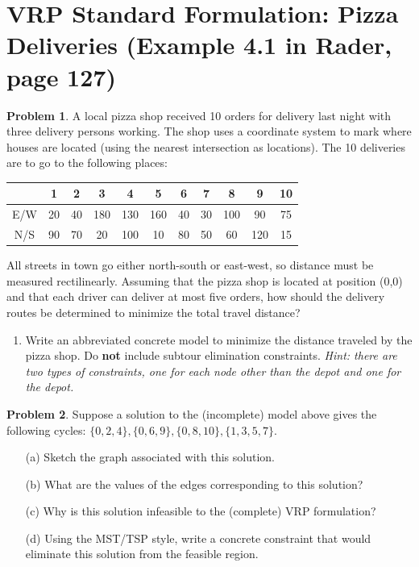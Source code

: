 \documentclass[11pt]{article}
\theoremstyle{definition}
\newtheorem{problem}{Problem}
\begin{document}
\newpage

\section{VRP Standard Formulation: Pizza Deliveries (Example 4.1 in Rader, page 127)}

\begin{problem}
A local pizza shop received 10 orders for delivery last night with three delivery persons working.  The shop uses a coordinate system to
mark where houses are located (using the nearest intersection as locations).  The
10 deliveries are to go to the following places:

\begin{center}
\begin{tabular}{|c|c|c|c|c|c|c|c|c|c|c|}
\hline
& 1 & 2 & 3 & 4 & 5 & 6 & 7 & 8 & 9 & 10  \\
\hline
E/W & 20 & 40 & 180 & 130 & 160 & 40 & 30 & 100 & 90 & 75 \\
\hline
N/S & 90 & 70 & 20 & 100 & 10 & 80 & 50 & 60 & 120 & 15 \\
\hline
\end{tabular}
\end{center}

All streets in town go either north-south or east-west, so distance must be
measured rectilinearly.  Assuming that the pizza shop is located at position (0,0)
and that each driver can deliver at most five orders, how should the delivery
routes be determined to minimize the total travel distance? 
\end{problem}

\begin{enumerate}
\item Write an abbreviated concrete model to minimize the distance traveled by the pizza shop. Do \textbf{not} include subtour elimination constraints. \emph{Hint: there are two types of constraints, one for each node other than the depot and one for the depot.}
\end{enumerate}

\newpage

\begin{problem}
Suppose a solution to the (incomplete) model above  gives the following cycles: $\{0,2,4\}, \{0,6,9\}, \{0,8,10\}, \{1,3,5,7\}$.
	\begin{enumerate}
	\item[(a)] Sketch the graph associated with this solution. \vfill
	\item[(b)] What are the values of the edges corresponding to this solution? 
	\vfill
	\item[(c)] Why is this solution infeasible to the (complete) VRP formulation? 
	\vfill
	\item[(d)] Using the MST/TSP style, write a concrete constraint that would eliminate this solution from the feasible region. \vfill
	\end{enumerate}
\end{problem}
\end{document}
